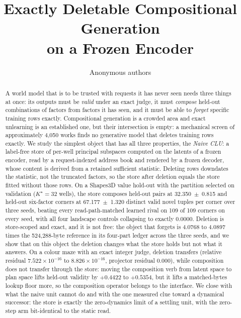 \documentclass{article} %
\title{Exactly Deletable Compositional Generation\\ on a Frozen Encoder}
\author{Anonymous authors}
\newcommand{\sci}[2]{\ensuremath{#1\times10^{#2}}}
\newcommand{\Kstar}{\ensuremath{K^{\star}}}
\begin{document}
\maketitle

\begin{abstract}
A world model that is to be trusted with requests it has never seen needs three things at
once: its outputs must be \emph{valid} under an exact judge, it must \emph{compose}
held-out combinations of factors from factors it has seen, and it must be able to
\emph{forget} specific training rows exactly. Compositional generation is a crowded area
and exact unlearning is an established one, but their intersection is empty: a mechanical
screen of approximately 4,050 works finds no generative model that deletes training rows
exactly. %
We study the simplest object that has all three properties, the \emph{Naive CLU}: a
label-free store of per-well principal subspaces computed on the latents of a frozen
encoder, read by a request-indexed address book and rendered by a frozen decoder, whose
content is derived from a retained sufficient statistic. Deleting rows downdates the
statistic, not the truncated factors, so the store after deletion equals the store fitted
without those rows. On a Shapes3D value hold-out with the partition selected on
validation ($\Kstar=32$ wells), the store composes held-out pairs at 32.350~$\pm$~0.815 and
held-out six-factor corners at 67.177~$\pm$~1.320 distinct valid novel tuples per corner over
three seeds, beating every read-path-matched learned rival on 109 of 109 corners on every
seed, with all four landscape controls collapsing to exactly 0.0000. %
Deletion is store-scoped and exact, and it is not free: the object that forgets is 4.0768 to
4.0897 times the 524,288-byte reference in its four-part ledger across the three seeds, and we
show that on this object the deletion changes what the store holds but not what it answers.
On a colour maze with an exact integer judge, deletion transfers
(relative residual \sci{7.522}{-16} to \sci{8.826}{-16}, projector residual 0.000), %
while composition does not transfer through the store: moving the composition verb from
latent space to plan space lifts held-out validity by $+0.4422$ to $+0.5354$, but it lifts a
matched-bytes lookup floor more, so the composition operator belongs to the interface.
We close with what the naive unit cannot do and with the one measured clue toward a
dynamical successor: the store is exactly the zero-dynamics limit of a settling unit, with
the zero-step arm bit-identical to the static read. %
\end{abstract}
\end{document}
